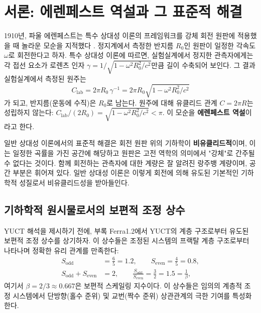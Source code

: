 \documentclass[12pt,a4paper]{article}
\newcommand{\betaf}{\beta}
\newcommand{\Sodd}{S_{\mathrm{odd}}}
\newcommand{\Seven}{S_{\mathrm{even}}}
\begin{document}
	\tableofcontents
	\newpage
	
	\section{서론: 에렌페스트 역설과 그 표준적 해결}
	\label{sec:intro}
	
	1910년, 파울 에렌페스트는 특수 상대성 이론의 프레임워크를 강체 회전 원판에 적용했을 때 놀라운 모순을 지적했다 \cite{Ehrenfest1909}. 정지계에서 측정한 반지름 \(R_0\)인 원판이 일정한 각속도 \(\omega\)로 회전한다고 하자. 특수 상대성 이론에 따르면, 실험실계에서 정지한 관측자에게는 각 접선 요소가 로렌츠 인자 \(\gamma = 1/\sqrt{1 - \omega^2 R_0^2/c^2}\)만큼 길이 수축되어 보인다. 그 결과 실험실계에서 측정된 원주는
	\[
	C_{\text{lab}} = 2\pi R_0 \, \gamma^{-1} = 2\pi R_0 \sqrt{1 - \omega^2 R_0^2/c^2}
	\]
	가 되고, 반지름(운동에 수직)은 \(R_0\)로 남는다. 원주에 대해 유클리드 관계 \(C = 2\pi R\)는 성립하지 않는다: \(C_{\text{lab}}/(2R_0) = \sqrt{1 - \omega^2 R_0^2/c^2} < \pi\). 이 모순을 \textbf{에렌페스트 역설}이라고 한다.
	
	일반 상대성 이론에서의 표준적 해결은 회전 원판 위의 기하학이 \textbf{비유클리드적}이며, 이는 일정한 곡률을 가진 공간에 해당하고 원판은 고전 역학의 의미에서 "강체"로 간주될 수 없다는 것이다. 함께 회전하는 관측자에 대한 계량은 잘 알려진 랑주뱅 계량이며, 공간 부분은 휘어져 있다. 일반 상대성 이론은 이렇게 회전에 의해 유도된 기본적인 기하학적 성질로서 비유클리드성을 받아들인다.
	
	\subsection{기하학적 원시물로서의 보편적 조정 상수}
	
	YUCT 해석을 제시하기 전에, 부록 Ferra1.2에서 YUCT의 계층 구조로부터 유도된 보편적 조정 상수를 상기하자. 이 상수들은 조정된 시스템의 프랙탈 계층 구조로부터 나타나며 정확한 유리 관계를 만족한다:
	\begin{align}
		\Sodd &= \frac{6}{5} = 1.2, \qquad \Seven = \frac{4}{5} = 0.8, \\
		\Sodd + \Seven &= 2, \qquad \frac{\Sodd}{\Seven} = \frac{3}{2} = 1.5 = \frac{1}{\betaf},
	\end{align}
	여기서 \(\betaf = 2/3 \approx 0.667\)은 보편적 스케일링 지수이다. 이 상수들은 임의의 계층적 조정 시스템에서 단방향(홀수 준위) 및 교번(짝수 준위) 상관관계의 극한 기여를 특성화한다.
	
\end{document}
